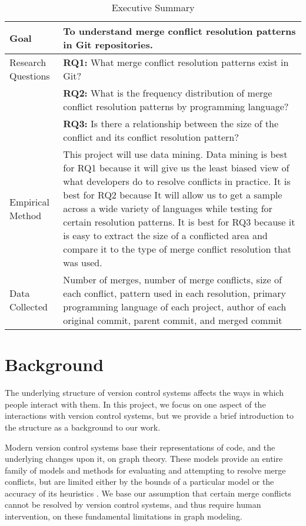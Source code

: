 \documentclass{sig-alternate-05-2015}
\begin{document}
\begin{table*}
\centering
\caption{Executive Summary}
\begin{tabular}{| l | p{10cm} | } \hline
Goal & To understand merge conflict resolution patterns in Git repositories. \\ \hline
Research Questions  & \textbf{RQ1:} What merge conflict resolution patterns exist in Git?\\
& \textbf{RQ2:} What is the frequency distribution of merge conflict resolution patterns by programming language?\\
& \textbf{RQ3:} Is there a relationship between the size of the conflict and its conflict resolution pattern?\\ \hline
Empirical Method & This project will use data mining. Data mining is best for RQ1 because it will give us the least biased view of what developers do to resolve conflicts in practice. It is best for RQ2 because It will allow us to get a sample across a wide variety of languages while testing for certain resolution patterns. It is best for RQ3 because it is easy to extract the size of a conflicted area and compare it to the type of merge conflict resolution that was used.\\ \hline
Data Collected & Number of merges, number of merge conflicts, size of each conflict, pattern used in each resolution, primary programming language of each project, author of each original commit, parent commit, and merged commit\\
\hline\end{tabular}
\label{table:t1}
\end{table*}

\section{Background}\label{Background}

The underlying structure of version control systems affects the ways in which people interact with them. In this project, we focus on one aspect of the interactions with version control systems, but we provide a brief introduction to the structure as a background to our work.

Modern version control systems base their representations of code, and the underlying changes upon it, on graph theory. These models provide an entire family of models and methods for evaluating and attempting to resolve merge conflicts, but are limited either by the bounds of a particular model or the accuracy of its heuristics \cite{ehrig15} \cite{mens99}. We base our assumption that certain merge conflicts cannot be resolved by version control systems, and thus require human intervention, on these fundamental limitations in graph modeling.
\end{document}
